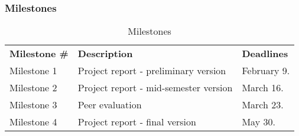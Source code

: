 \subsubsection{Milestones}
\begin{table}[H]
\centering
{}
\begin{tabular}{|l|l|l|}
\hline
\textbf{Milestone \#} & \textbf{Description} & \textbf{Deadlines}\\
Milestone 1& Project report - preliminary version & February 9. \\
Milestone 2 & Project report - mid-semester version & March 16.  \\
Milestone 3 & Peer evaluation & March 23.  \\
 Milestone 4 & Project report - final version & May 30.\\\hline
\end{tabular}
\caption{Milestones}
\end{table}